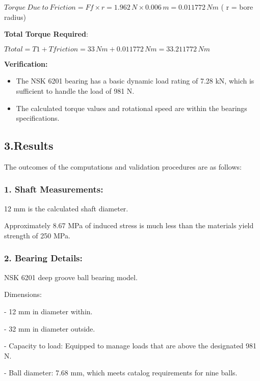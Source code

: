 \documentclass[../../main]{subfiles}
\begin{document}
\(Torque\ Due\ to\ Friction = Ff \times r = 1.962\, N \times 0.006\, m = 0.011772\, Nm\)
( r = bore radius)

\textbf{Total Torque Required}:

\(Ttotal = T1 + Tfriction = 33\, Nm + 0.011772\, Nm = 33.211772\, Nm\)

\textbf{Verification:}

\begin{itemize}
\item
  The NSK 6201 bearing has a basic dynamic load rating of 7.28 kN, which
  is sufficient to handle the load of 981 N.
\item
  The calculated torque values and rotational speed are within the
  bearing\textquotesingle s specifications.
\end{itemize}

\subsection{\texorpdfstring{\textbf{3.Results}}{3.Results}}\label{results}

The outcomes of the computations and validation procedures are as
follows:

\subsubsection{\texorpdfstring{1. \textbf{Shaft
Measurements}:}{1. Shaft Measurements:}}\label{shaft-measurements}

12 mm is the calculated shaft diameter.

Approximately 8.67 MPa of induced stress is much less than the
material\textquotesingle s yield strength of 250 MPa.

\subsubsection{\texorpdfstring{2. \textbf{Bearing
Details:}}{2. Bearing Details:}}\label{bearing-details}

NSK 6201 deep groove ball bearing model.

Dimensions:

- 12 mm in diameter within.

- 32 mm in diameter outside.

- Capacity to load: Equipped to manage loads that are above the
designated 981 N.

- Ball diameter: 7.68 mm, which meets catalog requirements for nine
balls.
\end{document}

